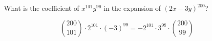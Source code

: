 \documentclass[../main.tex]{subfiles}
\begin{document}
What is the coefficient of $x^{101}y^{99}$ in the expansion of $(2x - 3y)^{200}$?

\solution
\[
	\binom{200}{101}\cdot2^{101}\cdot(-3)^{99}
	=
	-2^{101}\cdot3^{99}\cdot\binom{200}{99}
\]
\end{document}
